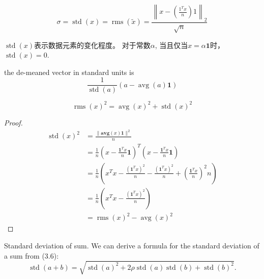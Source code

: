 \begin{definition}[$x$的标准差]
    \begin{equation}\sigma= \operatorname{std}(x)=\operatorname{rms}(\tilde{x})=\frac{\left\|x-\left( \frac{1^{T} x}{n} \right) 1\right\|_{2}}{\sqrt{n}} \end{equation}
\end{definition}

$\operatorname{std}(x)$表示数据元素的变化程度。 对于常数$\alpha$, 当且仅当$ x=\alpha \mathbf{1} $时， $ \operatorname{std}(x)=0 $.

\begin{corollary}
    the de-meaned vector in standard units is
\begin{equation}
\frac{1}{\operatorname{std}(a)}(a-\operatorname{avg}(a) \mathbf{1})
\end{equation}
\end{corollary}

\begin{theorem}
    \begin{equation} \operatorname{rms}(x)^{2}=\operatorname{avg}(x)^{2}+\operatorname{std}(x)^{2} \end{equation}
\end{theorem}

\begin{proof}
    \begin{equation}\displaystyle \begin{aligned}
        \operatorname{std} (x)^{2} & =\frac{\| \mathbf{avg} (x)\mathbf{1} \| ^{2}}{n}\\
         & =\frac{1}{n}\left( x-\frac{\mathbf{1}^{T} x}{n}\mathbf{1}\right)^{T}\left( x-\frac{\mathbf{1}^{T} x}{n}\mathbf{1}\right)\\
         & =\frac{1}{n}\left( x^{T} x-\frac{\left(\mathbf{1}^{T} x\right)^{2}}{n} -\frac{\left(\mathbf{1}^{T} x\right)^{2}}{n} +\left(\frac{\mathbf{1}^{T} x}{n}\right)^{2} n\right)\\
         & =\frac{1}{n}\left( x^{T} x-\frac{\left(\mathbf{1}^{T} x\right)^{2}}{n}\right)\\
         & =\operatorname{rms} (x)^{2} -\operatorname{avg} (x)^{2}
        \end{aligned}\end{equation}
\end{proof}

Standard deviation of sum. We can derive a formula for the standard deviation of a sum from (3.6):
\begin{equation}
\operatorname{std}(a+b)=\sqrt{\operatorname{std}(a)^{2}+2 \rho \operatorname{std}(a) \operatorname{std}(b)+\operatorname{std}(b)^{2}} .
\end{equation}

